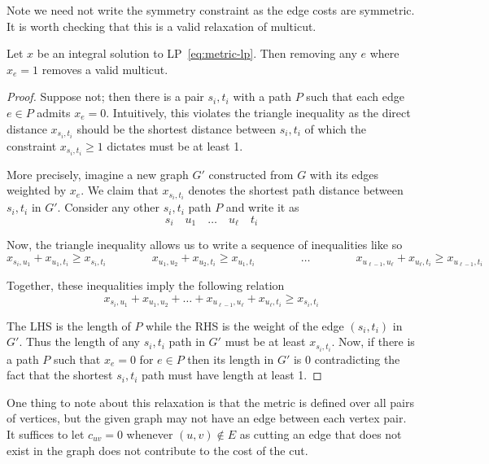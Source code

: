 Note we need not write the symmetry constraint as the edge costs are symmetric. It is worth checking that this is a valid relaxation of multicut.

\begin{claim}\label{claim:metric-valid}
Let $x$ be an integral solution to LP~\ref{eq:metric-lp}. Then removing any $e$ where $x_{e} = 1$ removes a valid multicut.
\end{claim}
\begin{proof}
Suppose not; then there is a pair $s_i, t_i$ with a path $P$ such that each edge $e \in P$ admits $x_e = 0$. Intuitively, this violates the triangle inequality as the direct distance $x_{s_i, t_i}$ should be the shortest distance between $s_i, t_i$ of which the constraint $x_{s_i, t_i} \geq 1$ dictates must be at least 1.

More precisely, imagine a new graph $G'$ constructed from $G$ with its edges weighted by $x_e$. We claim that $x_{s_i, t_i}$ denotes the shortest path distance between $s_i, t_i$ in $G'$. Consider any other $s_i, t_i$ path $P$ and write it as
\begin{equation*}
s_i
\quad u_1
\quad \ldots
\quad u_\ell
\quad t_i
\end{equation*}

Now, the triangle inequality allows us to write a sequence of inequalities like so
\begin{equation*}
x_{s_i, u_1} + x_{u_1, t_i} \geq x_{s_i, t_i}
\qquad\qquad
x_{u_1, u_2} + x_{u_2, t_i} \geq x_{u_1, t_i}
\qquad\qquad
\ldots
\qquad\qquad
x_{u_{\ell - 1}, u_\ell} + x_{u_\ell, t_i} \geq x_{u_{\ell - 1}, t_i}
\end{equation*}

Together, these inequalities imply the following relation
\begin{equation*}
x_{s_i, u_1} + x_{u_1, u_2} + \ldots + x_{u_{\ell - 1}, u_\ell} + x_{u_\ell, t_i} \geq x_{s_i, t_i}
\end{equation*}

The LHS is the length of $P$ while the RHS is the weight of the edge $(s_i, t_i)$ in $G'$. Thus the length of any $s_i, t_i$ path in $G'$ must be at least $x_{s_i, t_i}$. Now, if there is a path $P$ such that $x_e = 0$ for $e \in P$ then its length in $G'$ is 0 contradicting the fact that the shortest $s_i, t_i$ path must have length at least 1.
\end{proof}

One thing to note about this relaxation is that the metric is defined over all pairs of vertices, but the given graph may not have an edge between each vertex pair. It suffices to let $c_{uv} = 0$ whenever $(u, v) \notin E$ as cutting an edge that does not exist in the graph does not contribute to the cost of the cut.

